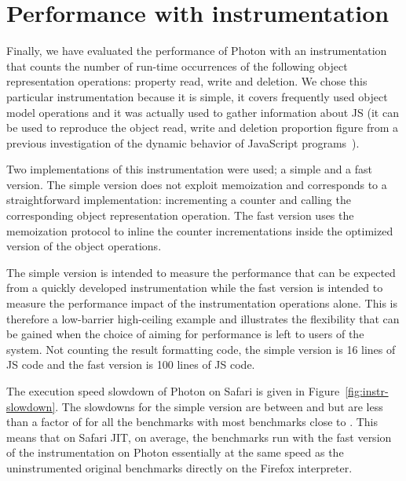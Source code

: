 \FloatBarrier


\section{Performance with instrumentation}


Finally, we have evaluated the performance of Photon with an instrumentation
that counts the number of run-time occurrences of the following object
representation operations: property read, write and deletion. We chose this
particular instrumentation because it is simple, it covers frequently used
object model operations and it was actually used to gather information about JS
(it can be used to reproduce the object read, write and deletion proportion
figure from a previous investigation of the dynamic behavior of JavaScript programs~\cite{behavior_js}).

Two implementations of this instrumentation were used; a simple and a
fast version.  The simple version does not exploit memoization and
corresponds to a straightforward implementation: incrementing a
counter and calling the corresponding object representation
operation. The fast version uses the memoization protocol to inline
the counter incrementations inside the optimized version of the object
operations.

The simple version is intended to measure the performance that can be
expected from a quickly developed instrumentation while the fast
version is intended to measure the performance impact of the
instrumentation operations alone. This is therefore a low-barrier
high-ceiling example and illustrates the flexibility that can be
gained when the choice of aiming for performance is left to users of
the system.  Not counting the result formatting code, the simple
version is 16 lines of JS code and the fast version is 100 lines of
JS code.

The execution speed slowdown of Photon on Safari is given in
Figure~\ref{fig:instr-slowdown}. The slowdowns for the simple version are
between  and  but are less than a factor of  for
all the benchmarks with most benchmarks close to . This means that on
Safari JIT, on average, the benchmarks run with the fast version of the
instrumentation on Photon essentially at the same speed as the uninstrumented
original benchmarks directly on the Firefox interpreter.

